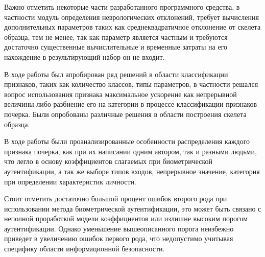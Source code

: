 Важно отметить некоторые части разработанного программного средства, в частности модуль определения неврологических отклонений, требует вычисления дополнительных параметров таких как среднеквадратичное отклонение от скелета образца, тем не менее, так как параметр является частным и требуются достаточно существенные вычислительные и временные затраты на его нахождение в результирующий набор он не входит.

В ходе работы был апробирован ряд решений в области классификации признаков, таких как количество классов, типы параметров, в частности решался вопрос использования признака максимальное ускорение как непрерывной величины либо разбиение его на категории в процессе классификации признаков почерка. Были опробованы различные решения в области построения скелета образца.

В ходе работы были проанализированные особенности распределения каждого признака почерка, как при их написании одним автором, так и разными людьми, что легло в основу коэффициентов слагаемых при биометрической аутентификации, а так же выборе типов входов, непрерывное значение, категория при определении характеристик личности. 

Стоит отметить достаточно большой процент ошибок второго рода при использовании метода биометрической аутентификации, это может быть связано с неполной проработкой модели коэффициентов или излишне высоким порогом аутентификации. Однако уменьшение вышеописанного порога неизбежно приведет в увеличению ошибок первого рода, что недопустимо учитывая специфику области информационной безопасности.

\newcommand{\tableHead}{\hline Тип признака & Название признака & Отклонение от обучающей выборки \\ \hline}

